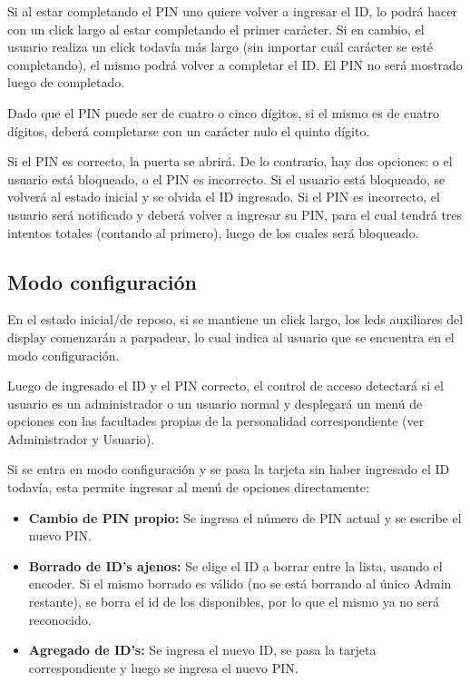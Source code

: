 \documentclass[10pt,a4paper]{article}
\begin{document}
Si al estar completando el PIN uno quiere volver a ingresar el ID, lo podrá hacer con un click largo al estar completando el primer carácter. Si en cambio, el usuario realiza un click todavía más largo (sin importar cuál carácter se esté completando), el mismo podrá volver a completar el ID. El PIN no será mostrado luego de completado.\par
Dado que el PIN puede ser de cuatro o cinco dígitos, si el mismo es de cuatro dígitos, deberá completarse con un carácter nulo el quinto dígito. \par
Si el PIN es correcto, la puerta se abrirá. De lo contrario, hay dos opciones: o el usuario está bloqueado, o el PIN es incorrecto. Si el usuario está bloqueado, se volverá al estado inicial y se olvida el ID ingresado. Si el PIN es incorrecto, el usuario será notificado y deberá volver a ingresar su PIN, para el cual tendrá tres intentos totales (contando al primero), luego de los cuales será bloqueado.\par

\subsection{Modo configuración}
En el estado inicial/de reposo, si se mantiene un click largo, los leds auxiliares del display comenzarán a parpadear, lo cual indica al usuario que se encuentra en el modo configuración.\par
Luego de ingresado el ID y el PIN correcto, el control de acceso detectará si el usuario es un administrador o un usuario normal y desplegará un menú de opciones con las facultades propias de la personalidad correspondiente (ver Administrador y Usuario).\par
Si se entra en modo configuración y se pasa la tarjeta sin haber ingresado el ID todavía, esta permite ingresar al menú de opciones directamente:
\begin{itemize}
\item \textbf{Cambio de PIN propio: } Se ingresa el número de PIN actual y se escribe el nuevo PIN.
\item \textbf{Borrado de ID's ajenos: } Se elige el ID a borrar entre la lista, usando el encoder. Si el mismo borrado es válido (no se está borrando al único Admin restante), se borra el id de los disponibles, por lo que el mismo ya no será reconocido.
\item \textbf{Agregado de ID's: } Se ingresa el nuevo ID, se pasa la tarjeta correspondiente y luego se ingresa el nuevo PIN.
\end{itemize}
\end{document}
